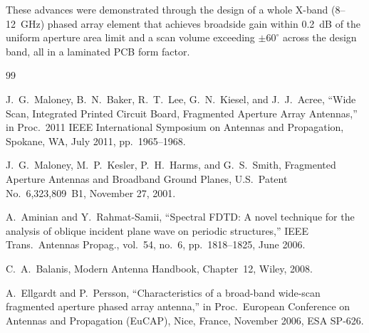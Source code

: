 These advances were demonstrated through the design of a whole X-band (8--12~GHz) phased array element that achieves broadside gain within 0.2~dB of the uniform aperture area limit and a scan volume exceeding $\pm 60^{\circ}$ across the design band, all in a laminated PCB form factor.

\FloatBarrier
\begin{thebibliography}{99}

 J.~G.~Maloney, B.~N.~Baker, R.~T.~Lee, G.~N.~Kiesel, and J.~J.~Acree, ``Wide Scan, Integrated Printed Circuit Board, Fragmented Aperture Array Antennas,'' in Proc.\ 2011 IEEE International Symposium on Antennas and Propagation, Spokane, WA, July 2011, pp.\ 1965--1968.

 J.~G.~Maloney, M.~P.~Kesler, P.~H.~Harms, and G.~S.~Smith, Fragmented Aperture Antennas and Broadband Ground Planes, U.S.\ Patent No.\ 6,323,809~B1, November 27, 2001.

 A.~Aminian and Y.~Rahmat-Samii, ``Spectral FDTD: A novel technique for the analysis of oblique incident plane wave on periodic structures,'' IEEE Trans.\ Antennas Propag., vol.~54, no.~6, pp.~1818--1825, June 2006.

 C.~A.~Balanis, Modern Antenna Handbook, Chapter~12, Wiley, 2008.

 A.~Ellgardt and P.~Persson, ``Characteristics of a broad-band wide-scan fragmented aperture phased array antenna,'' in Proc.\ European Conference on Antennas and Propagation (EuCAP), Nice, France, November 2006, ESA SP-626.

\end{thebibliography}


